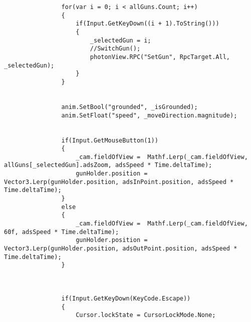 \begin{enumerate}
\begin{lstlisting}
                for(var i = 0; i < allGuns.Count; i++)
                {
                    if(Input.GetKeyDown((i + 1).ToString()))
                    {
                        _selectedGun = i;
                        //SwitchGun();
                        photonView.RPC("SetGun", RpcTarget.All, _selectedGun);
                    }
                }
    
                
                anim.SetBool("grounded", _isGrounded);
                anim.SetFloat("speed", _moveDirection.magnitude);
    
    
                if(Input.GetMouseButton(1))
                {
                    _cam.fieldOfView =  Mathf.Lerp(_cam.fieldOfView, allGuns[_selectedGun].adsZoom, adsSpeed * Time.deltaTime);
                    gunHolder.position = Vector3.Lerp(gunHolder.position, adsInPoint.position, adsSpeed * Time.deltaTime);
                }
                else
                {
                    _cam.fieldOfView =  Mathf.Lerp(_cam.fieldOfView, 60f, adsSpeed * Time.deltaTime);
                    gunHolder.position = Vector3.Lerp(gunHolder.position, adsOutPoint.position, adsSpeed * Time.deltaTime);
                }
    
    
    
                if(Input.GetKeyDown(KeyCode.Escape))
                {
                    Cursor.lockState = CursorLockMode.None;
                    

\end{lstlisting}
\end{enumerate}

